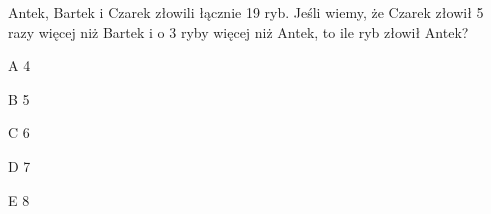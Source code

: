 \begin{tresc}
Antek, Bartek i Czarek złowili łącznie 19 ryb. Jeśli wiemy, że Czarek złowił 5 razy więcej niż Bartek i o 3 ryby więcej niż Antek, to ile ryb złowił Antek?
\end{tresc}
\begin{wariant}{A} 4 \end{wariant}
\begin{wariant}{B} 5 \end{wariant}
\begin{wariant}{C} 6 \end{wariant}
\begin{wariant}{D} 7 \end{wariant}
\begin{wariant}{E} 8 \end{wariant}
